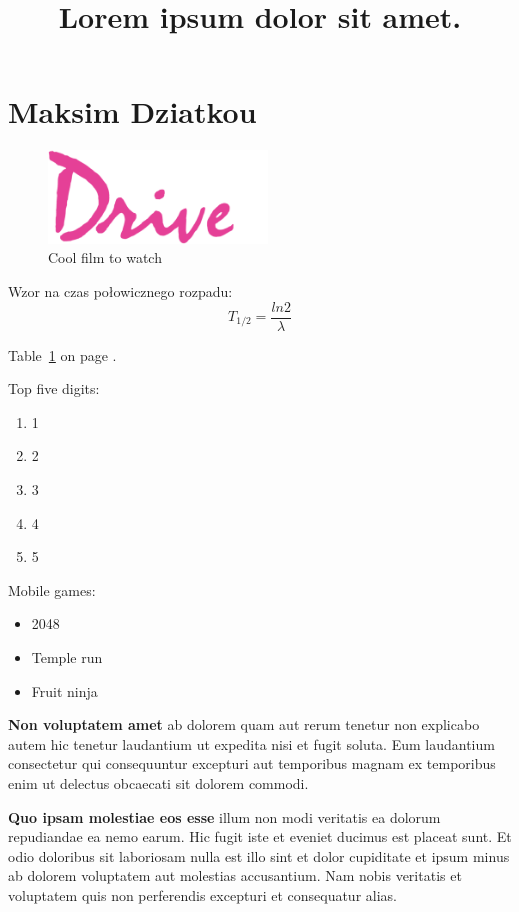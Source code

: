 \section{Maksim Dziatkou}
\label{sec:Maksim Dziaktou}

\begin{figure}[htbp]
    \centering
    \includegraphics[width = 220px]{pictures/drive.png}
    \caption{Cool film to watch}
    \label{fig:drive}
\end{figure}


Wzor na czas połowicznego rozpadu:
\[ T_{1/2}=\frac{ln2}{\lambda} \]


Table~\ref{sec:Maksim Dziaktou} on page \pageref{sec:Maksim Dziaktou}.


Top five digits:
\begin{enumerate}
    \item 1
    \item 2
    \item 3
    \item 4
    \item 5
\end{enumerate}

Mobile games:
\begin{itemize}
    \item 2048
    \item Temple run
    \item Fruit ninja
\end{itemize}

\newpage
\begin{flushleft}
\title{ \huge \textbf{Lorem ipsum dolor sit amet.}}
\vspace{0.2cm}
\par \textbf{Non voluptatem amet} ab dolorem quam aut rerum tenetur non explicabo autem hic tenetur laudantium ut expedita nisi et fugit soluta. Eum laudantium consectetur qui consequuntur excepturi aut temporibus magnam ex temporibus enim ut delectus obcaecati sit dolorem commodi. 
\vspace{0.2cm}
\par \textbf{Quo ipsam molestiae eos esse} illum non modi veritatis ea dolorum repudiandae ea nemo earum. Hic fugit iste et eveniet ducimus est placeat sunt. Et odio doloribus sit laboriosam nulla est illo sint et dolor cupiditate et ipsum minus ab dolorem voluptatem aut molestias accusantium. Nam nobis veritatis et voluptatem quis non perferendis excepturi et consequatur alias.
\end{flushleft}